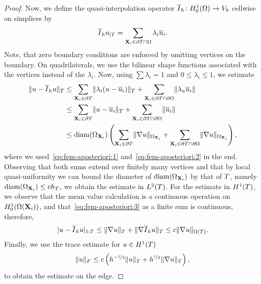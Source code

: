 \begin{proof}
  Now, we define the quasi-interpolation operator
  $\overline I_h\colon H^1_0(\Omega)\to V_h$ cellwise on simplices by
  \begin{gather}
    \label{eq:fem-aposteriori:3}
    \overline I_h u_{|T}
    = \sum_{\mathbf X_i\in\partial T\cap\Omega} \lambda_i \overline u_i.
  \end{gather}
  Note, that zero boundary conditions are enforced by omitting
  vertices on the boundary.  On quadrilaterals, we use the bilinear
  shape functions associated with the vertices instead of the
   $\lambda_i$. Now, using
  $\sum\lambda_i=1$ and $0\le \lambda_i \le 1$, we estimate
  \begin{align*}
    \lVert u - \overline I_h u\rVert_T
    & \le \sum_{\mathbf X_i\in\partial T} \lVert\lambda_i(u-\overline u_i)\rVert_{T}
      + \sum_{\mathbf X_i\in\partial T\cap\partial\Omega}
      \lVert\lambda_u \overline u_i\rVert \\
    & \le \sum_{\mathbf X_i\in\partial T} \lVert u-\overline u_i\rVert_{T}
      + \sum_{\mathbf X_i\in\partial T\cap\partial\Omega}
      \lVert\overline u_i\rVert \\
    & \le \operatorname{diam}({\Omega_{\mathbf X_i}})\left(
      \sum_{\mathbf X_i\in\partial T} \lVert\nabla u\rVert_{\Omega_{\mathbf X_i}}
      + \sum_{\mathbf X_i\in\partial T\cap\partial\Omega} \lVert\nabla u\rVert_{\Omega_{\mathbf X_i}}
      \right),
  \end{align*}
  where we used~\eqref{eq:fem-aposteriori:1}
  and~\eqref{eq:fem-aposteriori:2} in the end. Observing that both
  sums extend over finitely many vertices and that by local
  quasi-uniformity we can bound the diameter of
  $\operatorname{diam}({\Omega_{\mathbf X_i}})$ by that of $T$, namely
  $\operatorname{diam}({\Omega_{\mathbf X_i}}) \le c h_T$, we obtain the estimate
  in $L^2(T)$. For the estimate in $H^1(T)$, we observe that
  the mean value calculation is a continuous operation on
  $H^1_0(\Omega(\mathbf X_i))$, and that~\eqref{eq:fem-aposteriori:3} as a finite
  sum is continuous, therefore,
  \begin{gather}
    \lvert u-\overline I_h u\rvert_{1;T} \le \lVert\nabla u\rVert_{T} +
    \lVert\nabla \overline I_h u\rVert_{T}
    \le c \lVert\nabla u\rVert_{\Omega(T)}.
  \end{gather}
  Finally, we use the trace estimate for $u\in H^1(T)$
  \begin{gather}
    \lVert u\rVert_F
    \le c \left(h^{-\nicefrac12} \lVert u\rVert_T
      +h^{\nicefrac12} \lVert\nabla u\rVert_T\right),
  \end{gather}
  to obtain the estimate on the edge.
\end{proof}

